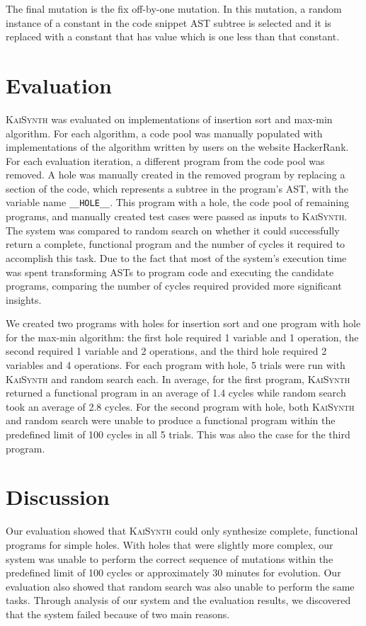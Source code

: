 \documentclass{article}
\begin{document}
The final mutation is the fix off-by-one mutation. In this mutation, a random instance of a constant in the code snippet AST subtree is selected and it is replaced with a constant that has value which is one less than that constant. 


\section{Evaluation}

\textsc{KaiSynth} was evaluated on implementations of insertion sort and max-min algorithm. For each algorithm, a code pool was manually populated with implementations of the algorithm written by users on the website HackerRank. For each evaluation iteration, a different program from the code pool was removed. A hole was manually created in the removed program by replacing a section of the code, which represents a subtree in the program's AST, with the variable name \texttt{\_\_HOLE\_\_}. This program with a hole, the code pool of remaining programs, and manually created test cases were passed as inputs to \textsc{KaiSynth}. The system was compared to random search on whether it could successfully return a complete, functional program and the number of cycles it required to accomplish this task. Due to the fact that most of the system's execution time was spent transforming ASTs to program code and executing the candidate programs, comparing the number of cycles required provided more significant insights.

We created two programs with holes for insertion sort and one program with hole for the max-min algorithm: the first hole required 1 variable and 1 operation, the second required 1 variable and 2 operations, and the third hole required 2 variables and 4 operations. For each program with hole, 5 trials were run with \textsc{KaiSynth} and random search each. In average, for the first program, \textsc{KaiSynth} returned a functional program in an average of 1.4 cycles while random search took an average of 2.8 cycles. For the second program with hole, both \textsc{KaiSynth} and random search were unable to produce a functional program within the predefined limit of 100 cycles in all 5 trials. This was also the case for the third program.

\section{Discussion}

Our evaluation showed that \textsc{KaiSynth} could only synthesize complete, functional programs for simple holes. With holes that were slightly more complex, our system was unable to perform the correct sequence of mutations within the predefined limit of 100 cycles or approximately 30 minutes for evolution. Our evaluation also showed that random search was also unable to perform the same tasks. Through analysis of our system and the evaluation results, we discovered that the system failed because of two main reasons.
\end{document}
